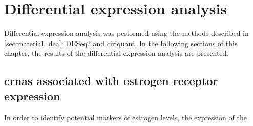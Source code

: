 \section{Differential expression analysis}
Differential expression analysis was performed using the methods described in
\cref{sec:material_dea}: DESeq2 and \gls{ciriquant}.
In the following sections of this chapter, the results of the differential
expression analysis are presented.

\subsection{\Glspl{crna} associated with estrogen receptor expression}

In order to identify potential markers of estrogen levels, the expression of
the 

